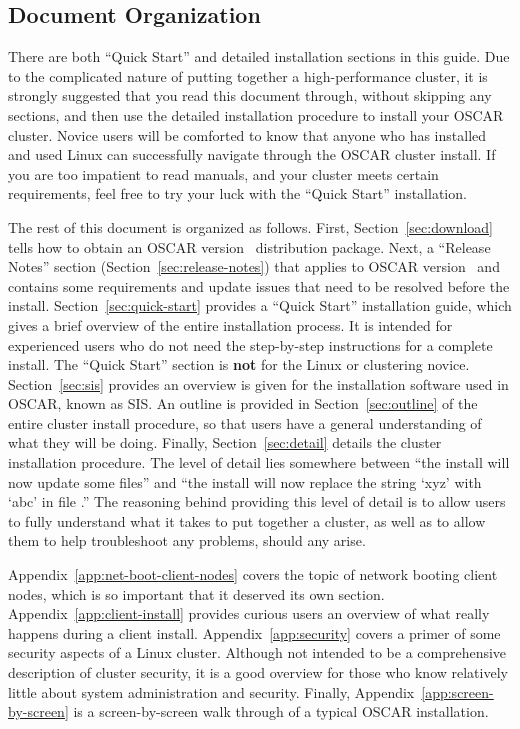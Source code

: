 \endchange


\subsection{Document Organization}

There are both ``Quick Start'' and detailed installation sections in
this guide. Due to the complicated nature of putting together a
high-performance cluster, it is strongly suggested that you read this
document through, without skipping any sections, and then use the
detailed installation procedure to install your OSCAR cluster.  Novice
users will be comforted to know that anyone who has installed and used
Linux can successfully navigate through the OSCAR cluster install.  If
you are too impatient to read manuals, and your cluster meets certain
requirements, feel free to try your luck with the ``Quick Start''
installation.

The rest of this document is organized as follows.  
%
First, Section~\ref{sec:download} tells how to obtain an OSCAR version
\oscarversion\ distribution package.
%
Next, a ``Release Notes'' section (Section~\ref{sec:release-notes})
that applies to OSCAR version \oscarversion\ and contains some
requirements and update issues that need to be resolved before the
install.
%
Section~\ref{sec:quick-start} provides a ``Quick Start'' installation
guide, which gives a brief overview of the entire installation
process.  It is intended for experienced users who do not need the
step-by-step instructions for a complete install.  The ``Quick Start''
section is {\bf not} for the Linux or clustering novice.
%
Section~\ref{sec:sis} provides an overview is given for the
installation software used in OSCAR, known as SIS.  
%
An outline is provided in Section~\ref{sec:outline} of the entire
cluster install procedure, so that users have a general understanding
of what they will be doing.
%
Finally, Section~\ref{sec:detail} details the cluster installation
procedure.  The level of detail lies somewhere between ``the install
will now update some files'' and ``the install will now replace the
string `xyz' with `abc' in file .'' The reasoning
behind providing this level of detail is to allow users to fully
understand what it takes to put together a cluster, as well as to
allow them to help troubleshoot any problems, should any arise.

Appendix~\ref{app:net-boot-client-nodes} covers the topic of network
booting client nodes, which is so important that it deserved its own
section.  
%
Appendix~\ref{app:client-install} provides curious users an overview
of what really happens during a client install.
%
Appendix~\ref{app:security} covers a primer of some security aspects
of a Linux cluster.  Although not intended to be a comprehensive
description of cluster security, it is a good overview for those who
know relatively little about system administration and security.
%
Finally, Appendix~\ref{app:screen-by-screen} is a screen-by-screen
walk through of a typical OSCAR installation.


